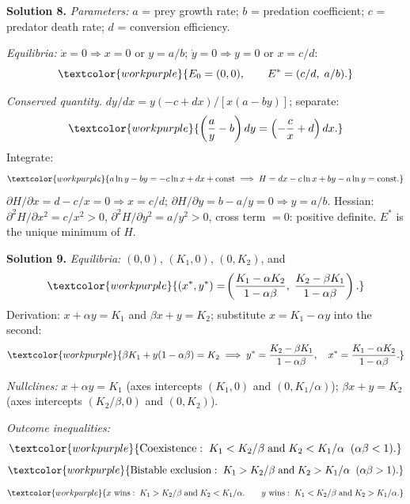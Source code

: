\medskip

\noindent\textbf{Solution 8.}\quad
\textit{Parameters:} $a$ = prey growth rate; $b$ = predation coefficient;
$c$ = predator death rate; $d$ = conversion efficiency.

\textit{Equilibria:} $\dot{x} = 0 \Rightarrow x = 0$ or $y = a/b$;
$\dot{y} = 0 \Rightarrow y = 0$ or $x = c/d$:
\[
  \textcolor{workpurple}{E_0 = (0,0), \qquad E^* = (c/d,\; a/b).}
\]

\textit{Conserved quantity.} $dy/dx = y(-c+dx)/[x(a-by)]$; separate:
\[
  \textcolor{workpurple}{\left(\frac{a}{y}-b\right)dy = \left(-\frac{c}{x}+d\right)dx.}
\]
Integrate:
\[
  \textcolor{workpurple}{a\ln y - by = -c\ln x + dx + \text{const}
  \;\Longrightarrow\;
  H = dx - c\ln x + by - a\ln y = \text{const}.}
\]
$\partial H/\partial x = d - c/x = 0 \Rightarrow x = c/d$;
$\partial H/\partial y = b - a/y = 0 \Rightarrow y = a/b$.
Hessian: $\partial^2 H/\partial x^2 = c/x^2 > 0$,
$\partial^2 H/\partial y^2 = a/y^2 > 0$, cross term $= 0$: positive
definite. $E^*$ is the unique minimum of $H$.

\medskip

\noindent\textbf{Solution 9.}\quad
\textit{Equilibria:}
$(0,0)$, $(K_1, 0)$, $(0, K_2)$, and
\[
  \textcolor{workpurple}{(x^*,y^*) = \!\left(\frac{K_1 - \alpha K_2}{1-\alpha\beta},\;
  \frac{K_2 - \beta K_1}{1-\alpha\beta}\right).}
\]
Derivation: $x + \alpha y = K_1$ and $\beta x + y = K_2$; substitute
$x = K_1 - \alpha y$ into the second:
\[
  \textcolor{workpurple}{\beta K_1 + y(1-\alpha\beta) = K_2
  \;\Longrightarrow\;
  y^* = \frac{K_2 - \beta K_1}{1-\alpha\beta},
  \quad
  x^* = \frac{K_1 - \alpha K_2}{1-\alpha\beta}.}
\]

\textit{Nullclines:}
$x + \alpha y = K_1$ (axes intercepts $(K_1,0)$ and $(0,K_1/\alpha)$);
$\beta x + y = K_2$ (axes intercepts $(K_2/\beta,0)$ and $(0,K_2)$).

\textit{Outcome inequalities:}
\[
  \textcolor{workpurple}{\text{Coexistence}:\;K_1 < K_2/\beta\;\text{and}\;K_2 < K_1/\alpha
  \;\;(\alpha\beta < 1).}
\]
\[
  \textcolor{workpurple}{\text{Bistable exclusion}:\;K_1 > K_2/\beta\;\text{and}\;K_2 > K_1/\alpha
  \;\;(\alpha\beta > 1).}
\]
\[
  \textcolor{workpurple}{x\text{ wins}:\;K_1 > K_2/\beta\;\text{and}\;K_2 < K_1/\alpha.
  \qquad
  y\text{ wins}:\;K_1 < K_2/\beta\;\text{and}\;K_2 > K_1/\alpha.}
\]

\medskip

